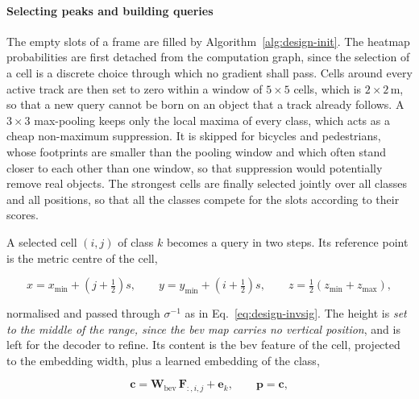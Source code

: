 
\paragraph{Selecting peaks and building queries}
\label{subsec:design-select}

The empty slots of a frame are filled by Algorithm~\ref{alg:design-init}. The heatmap probabilities are
first detached from the computation graph, since the selection of a cell is a discrete choice through which
no gradient shall pass. Cells around every active track are then set to zero within a window of $5 \times 5$
cells, which is $2 \times 2$\,m, so that a new query cannot be born on an object that a track already
follows. A $3 \times 3$ max-pooling keeps only the local maxima of every class, which acts as a cheap
non-maximum suppression. It is skipped for bicycles and pedestrians, whose footprints are smaller than the
pooling window and which often stand closer to each other than one window, so that suppression would potentially remove
real objects. The strongest cells are finally selected jointly over all classes and all positions, so that all
the classes compete for the slots according to their scores.

A selected cell $(i, j)$ of class $k$ becomes a query in two steps. Its reference point is the metric centre
of the cell,

\begin{equation}
    x = x_{\min} + \left( j + \tfrac{1}{2} \right) s, \qquad
    y = y_{\min} + \left( i + \tfrac{1}{2} \right) s, \qquad
    z = \tfrac{1}{2} \left( z_{\min} + z_{\max} \right),
    \label{eq:design-cell2metric}
\end{equation}

normalised and passed through $\sigma^{-1}$ as in Eq.~\eqref{eq:design-invsig}. The height is \emph{set to the
middle of the range, since the \ac{bev} map carries no vertical position}, and is left for the decoder to
refine. Its content is the \ac{bev} feature of the cell, projected to the embedding width, plus a learned
embedding of the class,

\begin{equation}
    \mathbf{c} = \mathbf{W}_{\mathrm{bev}}\, \mathbf{F}_{:,i,j} + \mathbf{e}_k, \qquad
    \mathbf{p} = \mathbf{c},
    \label{eq:design-content}
\end{equation}


